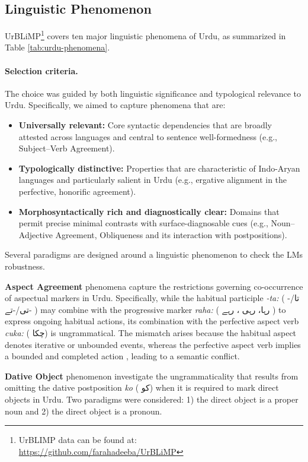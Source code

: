 \documentclass[11pt]{article}
\begin{document}
\subsection{Linguistic Phenomenon}
UrBLiMP\footnote{UrBLIMP data can be found at: \href{https://github.com/farahadeeba/UrBLiMP}{https://github.com/farahadeeba/UrBLiMP}} covers ten major linguistic phenomena of Urdu, as summarized in Table \ref{tab:urdu-phenomena}.  

\paragraph{Selection criteria.}
The choice was guided by both linguistic significance and typological relevance to Urdu. Specifically, we aimed to capture phenomena that are:

\begin{itemize}
    \item \textbf{Universally relevant:} Core syntactic dependencies that are broadly attested across languages and central to sentence well-formedness (e.g., Subject–Verb Agreement).
    \item \textbf{Typologically distinctive:} Properties that are characteristic of Indo-Aryan languages and particularly salient in Urdu (e.g., ergative alignment in the perfective, honorific agreement).
    \item \textbf{Morphosyntactically rich and diagnostically clear:} Domains that permit precise minimal contrasts with surface-diagnosable cues (e.g., Noun–Adjective Agreement, Obliqueness and its interaction with postpositions).
\end{itemize}
Several paradigms are designed around a linguistic phenomenon to check the LMs robustness.

\textbf{Aspect Agreement} phenomena capture the restrictions governing co-occurrence of aspectual markers in Urdu. Specifically, while the habitual participle {\em -ta:}  ( \foreignlanguage{arabic}{تا/-تی/-تے- }) may combine with the progressive marker {\em raha:}  ( \foreignlanguage{arabic}{رہا، رہی ، رہے }) to express ongoing habitual actions, its combination with the perfective aspect verb {\em cuka:}   ( \foreignlanguage{arabic}{چکا})  is ungrammatical. The mismatch arises because the habitual aspect denotes iterative or unbounded events, whereas the perfective aspect verb implies a bounded and completed action \cite{butt2008}, leading to a semantic conflict.

\textbf{Dative Object} phenomenon investigate the ungrammaticality that results from omitting the dative postposition {\em ko} ( \foreignlanguage{arabic}{ کو}) when it is required to mark direct objects in Urdu. Two paradigms were considered: 1) the direct object is a proper noun and 2) the direct object 
is a pronoun. 
\end{document}
